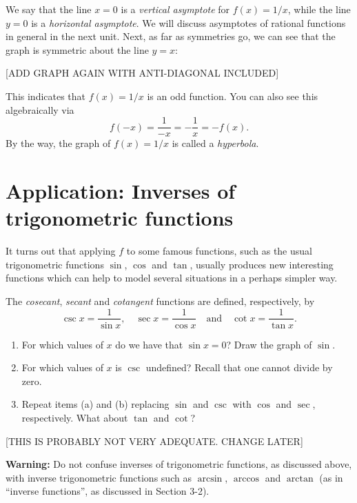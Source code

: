 \documentclass{ximera}
\begin{document}
We say that the line $x=0$ is a \emph{vertical asymptote} for $f(x) = 1/x$, while the line $y=0$ is a \emph{horizontal asymptote}. We will discuss asymptotes of rational functions in general in the next unit. Next, as far as symmetries go, we can see that the graph is symmetric about the line $y=x$:

[ADD GRAPH AGAIN WITH ANTI-DIAGONAL INCLUDED]

This indicates that $f(x) = 1/x$ is an odd function. You can also see this algebraically via \[  f(-x) = \frac{1}{-x} = -\frac{1}{x} = -f(x).  \]
By the way, the graph of $f(x) = 1/x$ is called a \emph{hyperbola}.

\section{Application: Inverses of trigonometric functions}

It turns out that applying $f$ to some famous functions, such as the usual trigonometric functions $\sin$, $\cos$ and $\tan$, usually produces new interesting functions which can help to model several situations in a perhaps simpler way.

\begin{definition}
  The \emph{cosecant}, \emph{secant} and \emph{cotangent} functions are defined, respectively, by \[   \csc x = \frac{1}{\sin x}, \quad \sec x = \frac{1}{\cos x} \quad\mbox{and}\quad \cot x = \frac{1}{\tan x}.  \]
\end{definition}

\begin{exploration}
  \begin{enumerate}[label=\alph*.]
  \item For which values of $x$ do we have that $\sin x = 0$? Draw the graph of $\sin$. 
  \item For which values of $x$ is $\csc$ undefined? Recall that one cannot divide by zero.
  \item Repeat items (a) and (b) replacing $\sin$ and $\csc$ with $\cos$ and $\sec$, respectively. What about $\tan$ and $\cot$?
  \end{enumerate}
  [THIS IS PROBABLY NOT VERY ADEQUATE. CHANGE LATER]
\end{exploration}

\begin{callout}
  {\bf Warning:} Do not confuse inverses of trigonometric functions, as discussed above, with inverse trigonometric functions such as $\arcsin$, $\arccos$ and $\arctan$ (as in ``inverse functions'', as discussed in Section 3-2).
\end{callout}
\end{document}
